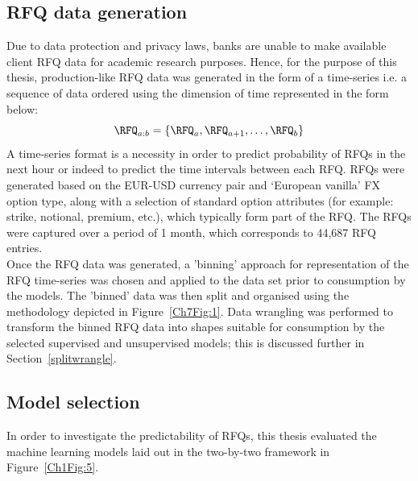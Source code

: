 \subsection{RFQ data generation}\label{Ch1Sec2S2}
Due to data protection and privacy laws, banks are unable to make available client RFQ data for academic research purposes. Hence, for the purpose of this thesis, production-like RFQ data was generated in the form of a time-series i.e. a sequence of data ordered using the dimension of time represented in the form below:
\begin{equation}\label{Eq:}
    \RFQ_{a\text{:}b} = \left\{ \RFQ_a,\RFQ_{a+1},\dots,\RFQ_{b}\right\}
\end{equation}
A time-series format is a necessity in order to predict probability of RFQs in the next hour or indeed to predict the time intervals between each RFQ. RFQs were generated based on the EUR-USD currency pair and `European vanilla' FX option type, along with a selection of standard option attributes (for example: strike, notional, premium, etc.), which typically form part of the RFQ. The RFQs were captured over a period of 1 month, which corresponds to 44,687 RFQ entries. \\
Once the RFQ data was generated, a 'binning' approach for representation of the RFQ time-series  was chosen and applied to the data set prior to consumption by the models. The 'binned' data was then split and organised using the methodology depicted in Figure~\ref{Ch7Fig:1}. Data wrangling was performed to transform the binned RFQ data into shapes suitable for consumption by the selected supervised and unsupervised models; this is discussed further in Section~\ref{splitwrangle}. 



\subsection{Model selection}\label{Ch1Sec2S3}

In order to investigate the predictability of RFQs, this thesis evaluated the machine learning models laid out in the two-by-two framework in Figure~\ref{Ch1Fig:5}.

